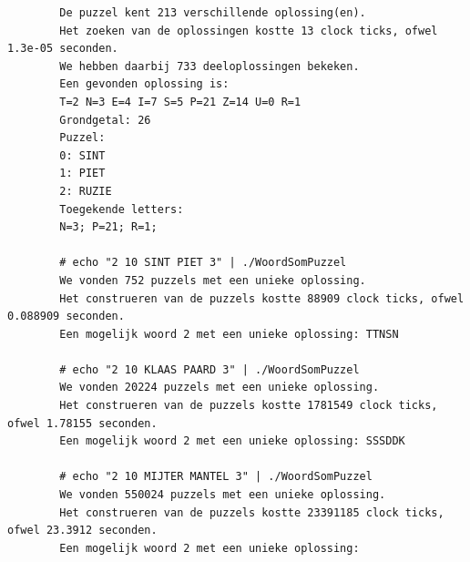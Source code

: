 \documentclass[twocolumn,10pt]{article}
\begin{document}
\begin{appendices}
\begin{lstlisting}
        De puzzel kent 213 verschillende oplossing(en).
        Het zoeken van de oplossingen kostte 13 clock ticks, ofwel 1.3e-05 seconden.
        We hebben daarbij 733 deeloplossingen bekeken.
        Een gevonden oplossing is:
        T=2 N=3 E=4 I=7 S=5 P=21 Z=14 U=0 R=1
        Grondgetal: 26 
        Puzzel:
        0: SINT
        1: PIET
        2: RUZIE
        Toegekende letters:
        N=3; P=21; R=1; 

        # echo "2 10 SINT PIET 3" | ./WoordSomPuzzel
        We vonden 752 puzzels met een unieke oplossing.
        Het construeren van de puzzels kostte 88909 clock ticks, ofwel 0.088909 seconden.
        Een mogelijk woord 2 met een unieke oplossing: TTNSN

        # echo "2 10 KLAAS PAARD 3" | ./WoordSomPuzzel
        We vonden 20224 puzzels met een unieke oplossing.
        Het construeren van de puzzels kostte 1781549 clock ticks, ofwel 1.78155 seconden.
        Een mogelijk woord 2 met een unieke oplossing: SSSDDK
        
        # echo "2 10 MIJTER MANTEL 3" | ./WoordSomPuzzel
        We vonden 550024 puzzels met een unieke oplossing.
        Het construeren van de puzzels kostte 23391185 clock ticks, ofwel 23.3912 seconden.
        Een mogelijk woord 2 met een unieke oplossing: 
        
    \end{lstlisting}
 
\end{appendices}
\end{document}
